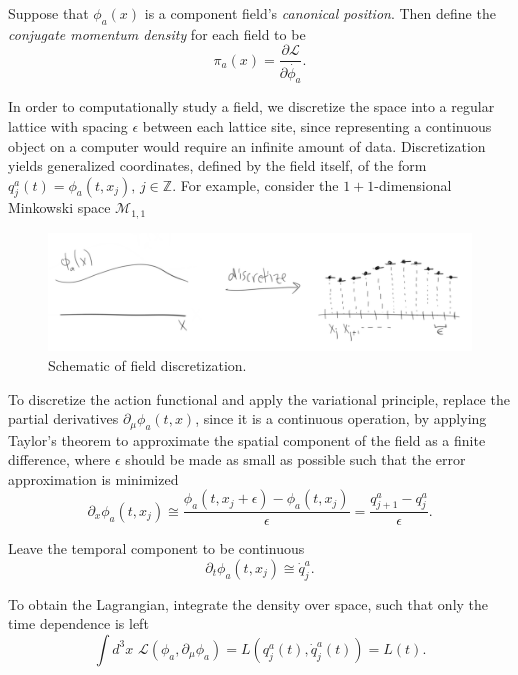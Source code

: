 \noindent Suppose that $\phi_a(x)$ is a component field's \textit{canonical position}. Then define the \textit{conjugate momentum density} for each field to be 
\begin{equation}
\pi_a(x) = \frac{\partial \mathscr{L}}{\partial \dot{\phi_a}}.
\end{equation}

\noindent In order to computationally study a field, we discretize the space into a regular lattice with spacing $\epsilon$ between each lattice site, since representing a continuous object on a computer would require an infinite amount of data. Discretization yields generalized coordinates, defined by the field itself, of the form $q_j^a(t) = \phi_a(t, x_j), \, j \in \mathbb{Z}$. For example, consider the $1+1$-dimensional Minkowski space $\mathcal{M}_{1,1}$

\begin{figure}[H]
	\centering
	\includegraphics[width=\linewidth]{discrete.png}
	\caption{Schematic of field discretization.}
	\label{fig:fig3}
\end{figure}

\noindent To discretize the action functional and apply the variational principle, replace the partial derivatives $\partial_\mu \phi_a(t, x)$, since it is a continuous operation, by applying Taylor's theorem to approximate the spatial component of the field as a finite difference, where $\epsilon$ should be made as small as possible such that the error approximation is minimized
\begin{equation}
\partial_x \phi_a(t, x_j) \cong \frac{\phi_a(t, x_j + \epsilon) - \phi_a(t, x_j)}{\epsilon} = \frac{q^a_{j+1} - q^a_j}{\epsilon}.
\end{equation}

\noindent Leave the temporal component to be continuous
\begin{equation}
\partial_t \phi_a(t, x_j) \cong \dot{q}_j^a . 
\end{equation}

\noindent To obtain the Lagrangian, integrate the density over space, such that only the time dependence is left
\begin{equation}
\int d^3 x \,\, \mathscr{L} (\phi_a, \partial_\mu \phi_a) = L(q_j^a (t), \dot{q}_j^a (t)) = L(t) . 
\end{equation}

